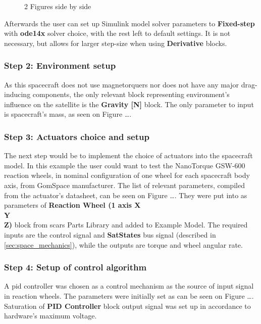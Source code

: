             \begin{figure}%
                \centering
                \qquad
                \caption{2 Figures side by side}%
                \label{fig:example}%
            \end{figure}
            
            Afterwards the user can set up Simulink model solver parameters to \textbf{Fixed-step} with \textbf{ode14x} solver choice, with the rest left to default settings. It is not necessary, but allows for larger step-size when using \textbf{Derivative} blocks.

        \subsubsection*{Step 2: Environment setup}
            As this spacecraft does not use magnetorquers nor does not have any major drag-inducing components, the only relevant block representing environment's influence on the satellite is the \textbf{Gravity [N]} block. The only parameter to input is spacecraft's mass, as seen on Figure \dots.

        \subsubsection*{Step 3: Actuators choice and setup}
            The next step would be to implement the choice of actuators into the spacecraft model. In this example the user could want to test the NanoTorque GSW-600 reaction wheels, in nominal configuration of one wheel for each spacecraft body axis, from GomSpace manufacturer. The list of relevant parameters, compiled from the actuator's datasheet, can be seen on Figure \dots. They were put into as parameters of \textbf{Reaction Wheel (1 axis X\\Y\\Z)} block from \ac{scars} Parts Library and added to Example Model. The required inputs are the control signal and \textbf{SatStates} bus signal (described in \autoref{sec:space_mechanics}), while the outputs are torque and wheel angular rate.

        
        \subsubsection*{Step 4: Setup of control algorithm}
            A \ac{pid} controller was chosen as a control mechanism as the source of input signal in reaction wheels. The parameters were initially set as can be seen on Figure \dots. Saturation of \textbf{PID Controller} block output signal was set up in accordance to hardware's maximum voltage.

